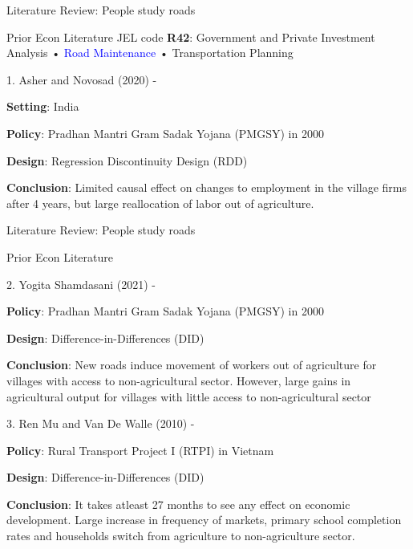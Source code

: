 \documentclass{beamer}
\begin{document}
\begin{frame}[t]{Literature Review: People study roads}\vspace{10pt}
    \label{lit_background}    
    \begin{block}{Prior Econ Literature}
    JEL code {\bf R42}: Government and Private Investment Analysis • \textcolor{blue}{Road Maintenance} • Transportation Planning 
    \vspace{0.2cm}
    
    1. Asher and Novosad (2020) - 
    
    {\small
    {\bf Setting}: India 
    
    {\bf Policy}: Pradhan Mantri Gram Sadak Yojana (PMGSY) in 2000 
    
    {\bf Design}: Regression Discontinuity Design (RDD)
    
    {\bf Conclusion}: Limited causal effect on changes to employment in the village firms after 4 years, but large reallocation of labor out of agriculture.
    }
    
    \hyperlink{main_lit}{}
    
    \end{block}
    \end{frame}
    
    \begin{frame}[t]{Literature Review: People study roads}\vspace{1pt}
    \begin{block}{Prior Econ Literature}
    
    2. Yogita Shamdasani (2021) -
    
    {\small
    
    {\bf Policy}: Pradhan Mantri Gram Sadak Yojana (PMGSY) in 2000 
    
    {\bf Design}: Difference-in-Differences (DID)
    
    {\bf Conclusion}: New roads induce movement of workers out of agriculture for villages with access to non-agricultural sector. However, large gains in agricultural output for villages with little access to non-agricultural sector
    } 
    
    3. Ren Mu and Van De Walle (2010) -
    
    {\small
    
    {\bf Policy}: Rural Transport Project I (RTPI) in Vietnam
    
    {\bf Design}: Difference-in-Differences (DID)
    
    {\bf Conclusion}: It takes atleast 27 months to see any effect on economic development. Large increase in frequency of markets, primary school completion rates and households switch from agriculture to non-agriculture sector.
    }
    
\end{block}
\end{frame}
    
\end{document}
